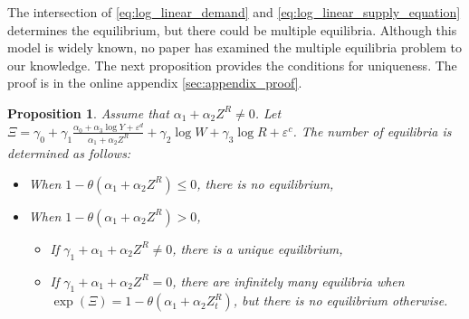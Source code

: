 \documentclass[11pt, a4paper]{article}
\newtheorem{proposition}{Proposition}
\theoremstyle{remark}
\begin{document}

The intersection of \eqref{eq:log_linear_demand} and \eqref{eq:log_linear_supply_equation} determines the equilibrium, but there could be multiple equilibria.
Although this model is widely known, no paper has examined the multiple equilibria problem to our knowledge.
The next proposition provides the conditions for uniqueness.
The proof is in the online appendix \ref{sec:appendix_proof}.
\begin{proposition}\label{prop:equilibrium_existence}
    Assume that $\alpha_1 + \alpha_2 Z^{R}\ne 0$. Let $\Xi = \gamma_0 + \gamma_1\frac{\alpha_0 + \alpha_3 \log Y + \varepsilon^{d}}{\alpha_1 + \alpha_2 Z^{R}} +  \gamma_2 \log W + \gamma_3 \log R + \varepsilon^{c}$.
    The number of equilibria is determined as follows:
    \begin{itemize}
        \item When $1 - \theta (\alpha_1 + \alpha_2 Z^{R}) \le 0$, there is no equilibrium,
        \item When $1 - \theta (\alpha_1 + \alpha_2 Z^{R}) >0$, 
        \begin{itemize}
            \item If $ \gamma_1 +\alpha_1+\alpha_2 Z^R \ne 0$, there is a unique equilibrium,
            \item If $\gamma_1 + \alpha_1+\alpha_2 Z^R = 0$, there are infinitely many equilibria when $\exp(\Xi) = 1 - \theta (\alpha_1 + \alpha_2 Z^{R}_{t})$, but there is no equilibrium otherwise.
        \end{itemize}
    \end{itemize}
\end{proposition}
\end{document}

